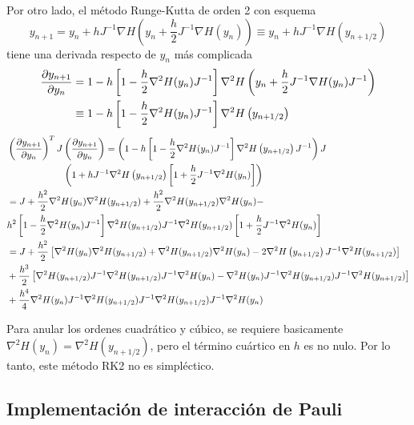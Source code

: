 Por otro lado, el método Runge-Kutta de orden 2 con esquema
\[ y_{n+1} = y_n + h J^{-1} \nabla H\left(y_n + \frac{h}{2} J^{-1} \nabla H(y_n) \right) \equiv y_n + h J^{-1} \nabla H\left(y_{n+1/2} \right) \]
tiene una derivada respecto de $y_n$ más complicada
\begin{align*}
\frac{\partial y_{n+1}}{\partial y_n} &=  1 - h\left[ 1 - \frac{h}{2} \nabla^2 H(y_n)J^{-1} \right]\nabla^2H\left(y_n + \frac{h}{2} J^{-1} \nabla H(y_n)J^{-1} \right) \\
&\equiv 1 - h\left[ 1 - \frac{h}{2} \nabla^2 H(y_n)J^{-1} \right]\nabla^2H\left(y_{n+1/2} \right) 
\end{align*}
\begin{align*}
 &\left( \frac{\partial y_{n+1}}{\partial y_n} \right)^T J \left( \frac{\partial y_{n+1}}{\partial y_n} \right) = \left( 1 - h\left[ 1 - \frac{h}{2} \nabla^2 H(y_n)J^{-1} \right]\nabla^2H\left(y_{n+1/2} \right)J^{-1} \right) J \\
 &\qquad \qquad \qquad \left(1 + hJ^{-1}\nabla^2H\left(y_{n+1/2} \right)\left[ 1 + \frac{h}{2} J^{-1} \nabla^2 H(y_n) \right] \right)\\
 &= J + \frac{h^2}{2} \nabla^2 H(y_n)\nabla^2H(y_{n+1/2}) + \frac{h^2}{2} \nabla^2H(y_{n+1/2})\nabla^2 H(y_n) -\\
 &h^2\left[ 1 - \frac{h}{2} \nabla^2 H(y_n)J^{-1} \right]\nabla^2H(y_{n+1/2}) J^{-1}\nabla^2H(y_{n+1/2})\left[ 1 + \frac{h}{2} J^{-1} \nabla^2 H(y_n) \right] \\
 &= J + \frac{h^2}{2} \left[ \nabla^2 H(y_n)\nabla^2H(y_{n+1/2}) +  \nabla^2H(y_{n+1/2})\nabla^2 H(y_n) - 2\nabla^2H\left(y_{n+1/2} \right) J^{-1}\nabla^2H(y_{n+1/2}) \right] \\
 & + \frac{h^3}{2} \left[ \nabla^2H(y_{n+1/2}) J^{-1}\nabla^2H(y_{n+1/2})J^{-1} \nabla^2 H(y_n) - \nabla^2 H(y_n)J^{-1}\nabla^2H(y_{n+1/2}) J^{-1}\nabla^2H(y_{n+1/2})\right] \\
 & + \frac{h^4}{4} \nabla^2 H(y_n)J^{-1}\nabla^2H(y_{n+1/2}) J^{-1}\nabla^2H(y_{n+1/2})J^{-1}\nabla^2 H(y_n)
\end{align*}

Para anular los ordenes cuadrático y cúbico, se requiere basicamente $\nabla^2H(y_n) = \nabla^2H(y_{n+1/2})$, pero el término cuártico en $h$ es no nulo.
Por lo tanto, este método RK2 no es simpléctico.

\subsection{Implementación de interacción de Pauli}

